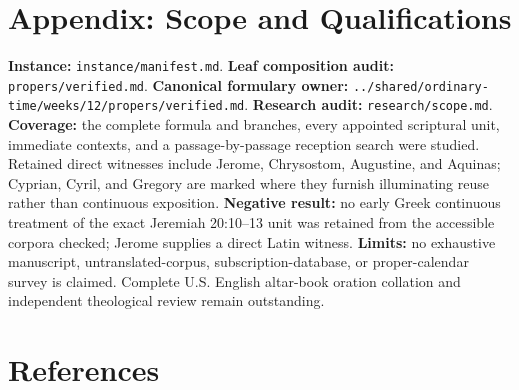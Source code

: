 \begin{deepstudy}
\clearpage

\section*{Appendix: Scope and Qualifications}

\begin{studyframe}
\textbf{Instance:} \nolinkurl{instance/manifest.md}. \textbf{Leaf composition audit:} \nolinkurl{propers/verified.md}. \textbf{Canonical formulary owner:} \nolinkurl{../shared/ordinary-time/weeks/12/propers/verified.md}. \textbf{Research audit:} \nolinkurl{research/scope.md}. \textbf{Coverage:} the complete formula and branches, every appointed scriptural unit, immediate contexts, and a passage-by-passage reception search were studied. Retained direct witnesses include Jerome, Chrysostom, Augustine, and Aquinas; Cyprian, Cyril, and Gregory are marked where they furnish illuminating reuse rather than continuous exposition. \textbf{Negative result:} no early Greek continuous treatment of the exact Jeremiah 20:10--13 unit was retained from the accessible corpora checked; Jerome supplies a direct Latin witness. \textbf{Limits:} no exhaustive manuscript, untranslated-corpus, subscription-database, or proper-calendar survey is claimed. Complete U.S. English altar-book oration collation and independent theological review remain outstanding.
\end{studyframe}

\section*{References}


\end{deepstudy}
